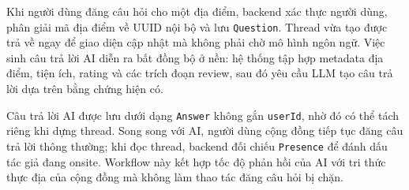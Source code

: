 \documentclass[12pt, a4paper]{article}
\begin{document}
Khi người dùng đăng câu hỏi cho một địa điểm, backend xác thực người dùng, phân giải mã địa điểm về UUID nội bộ và lưu \texttt{Question}. Thread vừa tạo được trả về ngay để giao diện cập nhật mà không phải chờ mô hình ngôn ngữ. Việc sinh câu trả lời AI diễn ra bất đồng bộ ở nền: hệ thống tập hợp metadata địa điểm, tiện ích, rating và các trích đoạn review, sau đó yêu cầu LLM tạo câu trả lời dựa trên bằng chứng hiện có.

Câu trả lời AI được lưu dưới dạng \texttt{Answer} không gắn \texttt{userId}, nhờ đó có thể tách riêng khi dựng thread. Song song với AI, người dùng cộng đồng tiếp tục đăng câu trả lời thông thường; khi đọc thread, backend đối chiếu \texttt{Presence} để đánh dấu tác giả đang onsite. Workflow này kết hợp tốc độ phản hồi của AI với tri thức thực địa của cộng đồng mà không làm thao tác đăng câu hỏi bị chặn.
\end{document}
